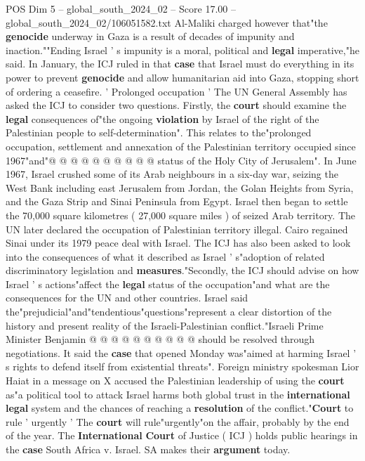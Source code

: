 \begin{textsample}{POS Dim 5 – global\_south\_2024\_02 – Score 17.00 – global\_south\_2024\_02/106051582.txt}
Al-Maliki charged however that"the \textbf{genocide} underway in Gaza is a result of decades of impunity and inaction.""Ending Israel ' s impunity is a moral, political and \textbf{legal} imperative,"he said.
In January, the ICJ ruled in that \textbf{case} that Israel must do everything in its power to prevent \textbf{genocide} and allow humanitarian aid into Gaza, stopping short of ordering a ceasefire. ' Prolonged occupation ' The UN General Assembly has asked the ICJ to consider two questions.
Firstly, the \textbf{court} should examine the \textbf{legal} consequences of"the ongoing \textbf{violation} by Israel of the right of the Palestinian people to self-determination".
This relates to the"prolonged occupation, settlement and annexation of the Palestinian territory occupied since 1967"and"@ @ @ @ @ @ @ @ @ @ status of the Holy City of Jerusalem".
In June 1967, Israel crushed some of its Arab neighbours in a six-day war, seizing the West Bank including east Jerusalem from Jordan, the Golan Heights from Syria, and the Gaza Strip and Sinai Peninsula from Egypt.
Israel then began to settle the 70,000 square kilometres ( 27,000 square miles ) of seized Arab territory.
The UN later declared the occupation of Palestinian territory illegal.
Cairo regained Sinai under its 1979 peace deal with Israel.
The ICJ has also been asked to look into the consequences of what it described as Israel ' s"adoption of related discriminatory legislation and \textbf{measures}."Secondly, the ICJ should advise on how Israel ' s actions"affect the \textbf{legal} status of the occupation"and what are the consequences for the UN and other countries.
Israel said the"prejudicial"and"tendentious"questions"represent a clear distortion of the history and present reality of the Israeli-Palestinian conflict."Israeli Prime Minister Benjamin @ @ @ @ @ @ @ @ @ @ should be resolved through negotiations.
It said the \textbf{case} that opened Monday was"aimed at harming Israel ' s rights to defend itself from existential threats".
Foreign ministry spokesman Lior Haiat in a message on X accused the Palestinian leadership of using the \textbf{court} as"a political tool to attack Israel harms both global trust in the \textbf{international} \textbf{legal} system and the chances of reaching a \textbf{resolution} of the conflict."\textbf{Court} to rule ' urgently ' The \textbf{court} will rule"urgently"on the affair, probably by the end of the year.
The \textbf{International} \textbf{Court} of Justice ( ICJ ) holds public hearings in the \textbf{case} South Africa v.
Israel.
SA makes their \textbf{argument} today.

\end{textsample}
